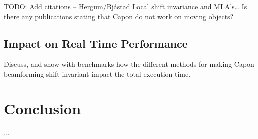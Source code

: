 \documentclass[journal]{IEEEtran}
\begin{document}
TODO: Add citations – Hergum/Bjåstad Local shift invariance and MLA’s… Is there any publications stating that Capon do not work on moving objects?

\subsection{Impact on Real Time Performance}
Discuss, and show with benchmarks how the different methods for making Capon beamforming shift-invariant impact the total execution time.

\section{Conclusion}\label{sec:con}
...


%
%



%
%
\end{document}
